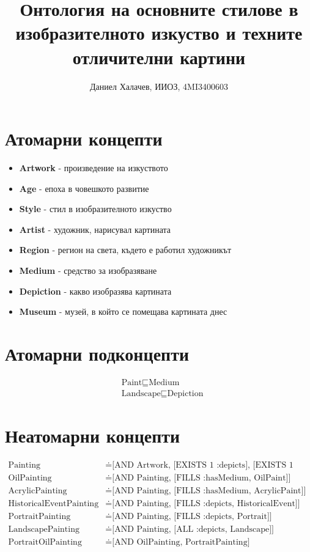 \documentclass[a4paper, 11pt]{article}
\begin{document}
\author{Даниел Халачев, ИИОЗ, 4MI3400603}
\title{Онтология на основните стилове в изобразителното изкуство и техните отличителни картини}
\maketitle

\section*{Атомарни концепти}
\begin{itemize}
  \item \textbf{Artwork} - произведение на изкуството
  \item \textbf{Age} - епоха в човешкото развитие
  \item \textbf{Style} - стил в изобразителното изкуство
  \item \textbf{Artist} - художник, нарисувал картината
  \item \textbf{Region} - регион на света, където е работил художникът
  \item \textbf{Medium} - средство за изобразяване
  \item \textbf{Depiction} - какво изобразява картината
  \item \textbf{Museum} - музей, в който се помещава картината днес
\end{itemize}

\section*{Атомарни подконцепти}
\begin{align*}
  &\text{Paint} \sqsubseteq \text{Medium} \\
  &\text{Landscape} \sqsubseteq \text{Depiction}
\end{align*}

\section*{Неатомарни концепти}
\begin{align*}
  \text{Painting} &\doteq \text{[AND Artwork, [EXISTS 1 :depicts], [EXISTS 1 :hasMedium]]} \\
  \text{OilPainting} &\doteq \text{[AND Painting, [FILLS :hasMedium, OilPaint]]} \\
  \text{AcrylicPainting} &\doteq \text{[AND Painting, [FILLS :hasMedium, AcrylicPaint]]} \\
  \text{HistoricalEventPainting} &\doteq \text{[AND Painting, [FILLS :depicts, HistoricalEvent]]} \\
  \text{PortraitPainting} &\doteq \text{[AND Painting, [FILLS :depicts, Portrait]]} \\
  \text{LandscapePainting} &\doteq \text{[AND Painting, [ALL :depicts, Landscape]]} \\
  \text{PortraitOilPainting} &\doteq \text{[AND OilPainting, PortraitPainting]}
\end{align*}
\end{document}
